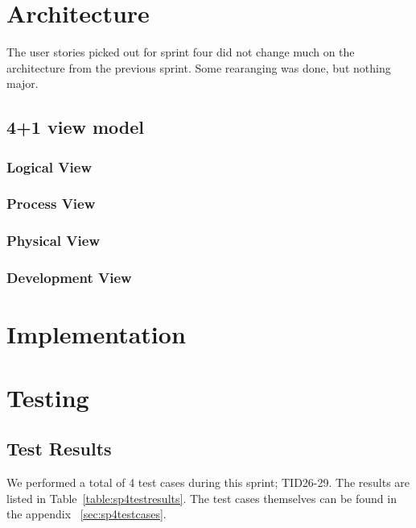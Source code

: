 \section{Architecture}
The user stories picked out for sprint four did not change much on the architecture from the previous sprint. Some rearanging was done, but nothing major.

\subsection{4+1 view model}
\subsubsection{Logical View}
\subsubsection{Process View}
\subsubsection{Physical View}
\subsubsection{Development View}

\section{Implementation}

\section{Testing}
\subsection{Test Results}
We performed a total of 4 test cases during this sprint; TID26-29. The results are listed in Table~\ref{table:sp4testresults}. The test cases themselves can be found in the appendix ~\ref{sec:sp4testcases}.


